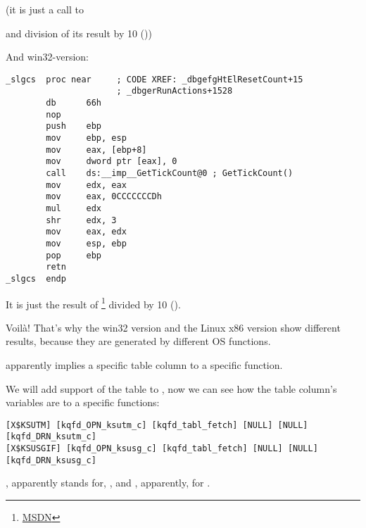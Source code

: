 (it is just a call to 

and division of its result by 10 ())

And win32-version:

\begin{lstlisting}[style=customasmx86]
_slgcs  proc near     ; CODE XREF: _dbgefgHtElResetCount+15
                      ; _dbgerRunActions+1528
        db      66h
        nop
        push    ebp
        mov     ebp, esp
        mov     eax, [ebp+8]
        mov     dword ptr [eax], 0
        call    ds:__imp__GetTickCount@0 ; GetTickCount()
        mov     edx, eax
        mov     eax, 0CCCCCCCDh
        mul     edx
        shr     edx, 3
        mov     eax, edx
        mov     esp, ebp
        pop     ebp
        retn
_slgcs  endp
\end{lstlisting}

It is just the result of 
\footnote{\href{http://go.yurichev.com/17248}{MSDN}}
divided by 10 ().


Voilà! That's why the win32 version and the Linux x86 version show different results, 
because they are generated by different \ac{OS} functions.

 apparently implies  a specific table column to a specific function.

We will add support of the table  to \oracletables, 
now we can see how the table column's variables are  to a specific functions:

\begin{lstlisting}
[X$KSUTM] [kqfd_OPN_ksutm_c] [kqfd_tabl_fetch] [NULL] [NULL] [kqfd_DRN_ksutm_c]
[X$KSUSGIF] [kqfd_OPN_ksusg_c] [kqfd_tabl_fetch] [NULL] [NULL] [kqfd_DRN_ksusg_c]
\end{lstlisting}

, apparently stands for, , and , apparently, for .

